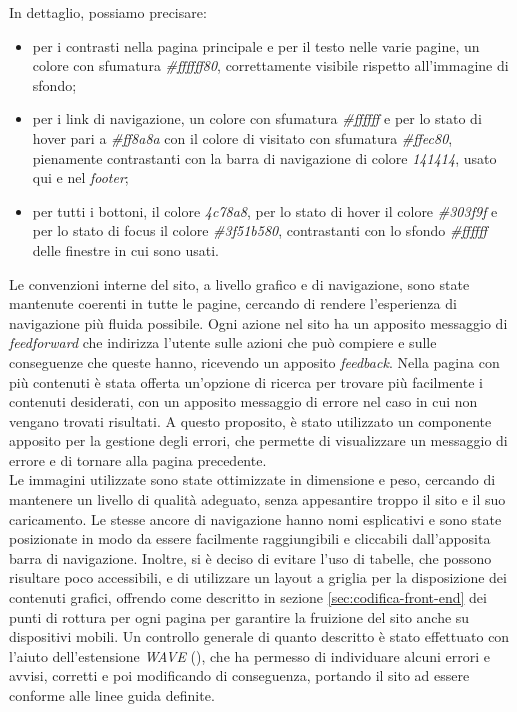 In dettaglio, possiamo precisare:
\begin{itemize}
    \item per i contrasti nella pagina principale e per il testo nelle varie pagine, un colore con sfumatura \textit{\#ffffff80}, correttamente visibile rispetto all'immagine di sfondo;
    \item per i link di navigazione, un colore con sfumatura \textit{\#ffffff} e per lo stato di hover pari a \textit{\#ff8a8a} con il colore di visitato con sfumatura \textit{\#ffec80}, pienamente contrastanti con la barra di navigazione di colore \textit{141414}, usato qui e nel \textit{footer};
    \item per tutti i bottoni, il colore \textit{4c78a8}, per lo stato di hover il colore \textit{\#303f9f} e per lo stato di focus il colore \textit{\#3f51b580}, contrastanti con lo sfondo \textit{\#ffffff} delle finestre in cui sono usati.
\end{itemize}

Le convenzioni interne del sito, a livello grafico e di navigazione, sono state mantenute coerenti in tutte le pagine, cercando di rendere l'esperienza di navigazione più fluida possibile.
Ogni azione nel sito ha un apposito messaggio di \textit{feedforward} che indirizza l'utente sulle azioni che può compiere e sulle conseguenze che queste hanno, ricevendo un apposito \textit{feedback}.
Nella pagina con più contenuti è stata offerta un'opzione di ricerca per trovare più facilmente i contenuti desiderati, con un apposito messaggio di errore nel caso in cui non vengano trovati risultati.
A questo proposito, è stato utilizzato un componente apposito per la gestione degli errori, che permette di visualizzare un messaggio di errore e di tornare alla pagina precedente. \\

Le immagini utilizzate sono state ottimizzate in dimensione e peso, cercando di mantenere un livello di qualità adeguato, senza appesantire troppo il sito e il suo caricamento.
Le stesse ancore di navigazione hanno nomi esplicativi e sono state posizionate in modo da essere facilmente raggiungibili e cliccabili dall'apposita barra di navigazione.
Inoltre, si è deciso di evitare l'uso di tabelle, che possono risultare poco accessibili, e di utilizzare un layout a griglia per la disposizione dei contenuti grafici, offrendo come descritto in sezione \ref{sec:codifica-front-end} dei punti di rottura per ogni pagina per garantire la fruizione del sito anche su dispositivi mobili.
Un controllo generale di quanto descritto è stato effettuato con l'aiuto dell'estensione \textit{WAVE} (\cite{site:wave}), che ha permesso di individuare alcuni errori e avvisi, corretti e poi modificando di conseguenza,
portando il sito ad essere conforme alle linee guida definite. 

